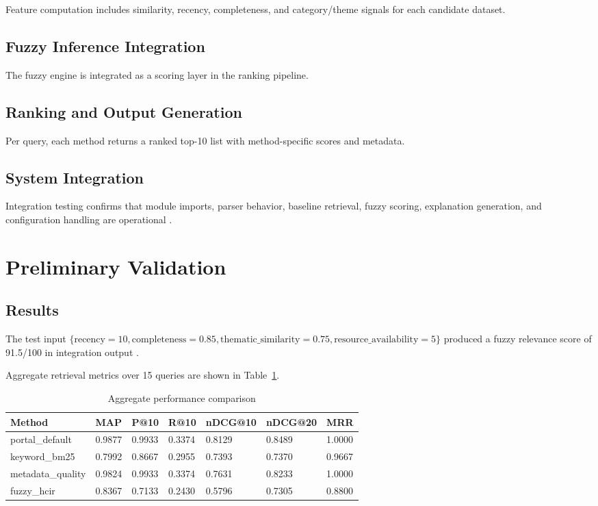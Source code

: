 \documentclass[11pt,a4paper]{article}
\begin{document}
Feature computation includes similarity, recency, completeness, and category/theme signals for each candidate dataset.

\subsection{Fuzzy Inference Integration}

The fuzzy engine is integrated as a scoring layer in the ranking pipeline.

\subsection{Ranking and Output Generation}

Per query, each method returns a ranked top-10 list with method-specific scores and metadata.

\subsection{System Integration}

Integration testing confirms that module imports, parser behavior, baseline retrieval, fuzzy scoring, explanation generation, and configuration handling are operational \citep{integrationTest2026}.

\section{Preliminary Validation}

\subsection{Results}

The test input $\{\text{recency}=10,\text{completeness}=0.85,\text{thematic\_similarity}=0.75,\text{resource\_availability}=5\}$ produced a fuzzy relevance score of 91.5/100 in integration output \citep{integrationTest2026}.

Aggregate retrieval metrics over 15 queries are shown in Table~\ref{tab:aggregate}.

\begin{table}[H]
\centering
\begin{tabular}{p{} p{} p{} p{} p{} p{} p{}}
\toprule
\textbf{Method} & \textbf{MAP} & \textbf{P@10} & \textbf{R@10} & \textbf{nDCG@10} & \textbf{nDCG@20} & \textbf{MRR} \\
\midrule
portal\_default & 0.9877 & 0.9933 & 0.3374 & 0.8129 & 0.8489 & 1.0000 \\
keyword\_bm25 & 0.7992 & 0.8667 & 0.2955 & 0.7393 & 0.7370 & 0.9667 \\
metadata\_quality & 0.9824 & 0.9933 & 0.3374 & 0.7631 & 0.8233 & 1.0000 \\
fuzzy\_hcir & 0.8367 & 0.7133 & 0.2430 & 0.5796 & 0.7305 & 0.8800 \\
\bottomrule
\end{tabular}
\caption{Aggregate performance comparison}
\label{tab:aggregate}
\end{table}
\end{document}
